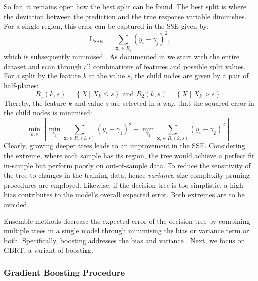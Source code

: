 So far, it remains open how the best split can be found. The best split is where the deviation between the prediction and the true response variable diminishes. For a single region, this error can be captured in the \gls{SSE} given by:
\begin{equation}
    \operatorname{L}_{\mathrm{SSE}} =\sum_{\mathbf{x}_{i} \in R_j}\left(y_{i}-\gamma_{j}\right)^{2},
\end{equation}
which is subsequently minimised \autocite[][231]{breimanClassificationRegressionTrees2017}. As documented in \textcite[][326]{hastietrevorElementsStatisticalLearning2009} we start with the entire dataset and scan through all combinations of features and possible split values. For a split by the feature $k$ at the value $s$, the child nodes are given by a pair of half-planes:
\begin{equation}
    R_1(k, s)=\left\{X \mid X_k \leq s\right\} \text { and } R_2(k, s)=\left\{X \mid X_k>s\right\}.
\end{equation}
Thereby, the feature $k$ and value $s$ are selected in a way, that the squared error in the child nodes is minimised:
\begin{equation}
    \min _{k, s}\left[\min _{\gamma_1} \sum_{\mathbf{x}_i \in R_1(k, s)}\left(y_i-\gamma_1\right)^2+\min _{\gamma_2} \sum_{\mathbf{x}_i \in R_2(k, s)}\left(y_i-\gamma_2\right)^2\right].
\end{equation}
Clearly, growing deeper trees leads to an improvement in the \gls{SSE}. Considering the extreme, where each sample has its region, the tree would achieve a perfect fit in-sample but perform poorly on out-of-sample data. To reduce the sensitivity of the tree to changes in the training data, hence \emph{variance}, size complexity pruning procedures are employed. Likewise, if the decision tree is too simplistic, a high bias contributes to the model's overall expected error. Both extremes are to be avoided.

Ensemble methods decrease the expected error of the decision tree by combining multiple trees in a single model through minimising the bias or variance term or both. Specifically, boosting addresses the bias and variance \autocites[][1672]{schapireBoostingMarginNew1998}[][29]{breimanRandomForests2001}. Next, we focus on \gls{GBRT}, a variant of boosting.

\subsubsection{Gradient Boosting
    Procedure}\label{sec:gradient-boosting-procedure}

